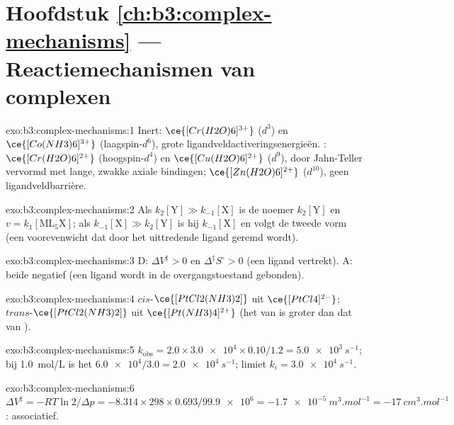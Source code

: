 \section*{Hoofdstuk \ref{ch:b3:complex-mechanisms} --- Reactiemechanismen van complexen}

\begin{solution}{exo:b3:complex-mechanisms:1}
Inert: $\ce{[Cr(H2O)6]^{3+}}$ ($d^3$) en $\ce{[Co(NH3)6]^{3+}}$ (laagspin-$d^6$), grote
ligandveldactiveringsenergieën. : $\ce{[Cr(H2O)6]^{2+}}$ (hoogspin-$d^4$) en $\ce{[Cu(H2O)6]^{2+}}$ ($d^9$),
door Jahn-Teller vervormd met lange, zwakke axiale bindingen; $\ce{[Zn(H2O)6]^{2+}}$ ($d^{10}$), geen
ligandveldbarrière.
\end{solution}

\begin{solution}{exo:b3:complex-mechanisms:2}
Als $k_2[\mathrm Y] \gg k_{-1}[\mathrm X]$ is de noemer $k_2[\mathrm Y]$ en $v = k_1[\mathrm{ML_5X}]$; als $k_{-1}[\mathrm X] \gg k_2[\mathrm Y]$ is hij
$k_{-1}[\mathrm X]$ en volgt de tweede vorm (een voorevenwicht dat door het uittredende
ligand geremd wordt).
\end{solution}

\begin{solution}{exo:b3:complex-mechanisms:3}
D: $\Delta V^{\ddagger} > 0$ en $\Delta^{\ddagger}S^\circ > 0$ (een ligand vertrekt). A: beide negatief (een ligand wordt in
de overgangstoestand gebonden).
\end{solution}

\begin{solution}{exo:b3:complex-mechanisms:4}
$cis$-$\ce{[PtCl2(NH3)2]}$ uit $\ce{[PtCl4]^{2-}}$; $trans$-$\ce{[PtCl2(NH3)2]}$ uit $\ce{[Pt(NH3)4]^{2+}}$ (het
 van  is groter dan dat van ).
\end{solution}

\begin{solution}{exo:b3:complex-mechanisms:5}
$k_{\mathrm{obs}} = 2.0 \times \num{3.0e4} \times 0.10/1.2 = \qty{5.0e3}{s^{-1}}$; bij \qty{1.0}{mol/L} is het $\num{6.0e4}/3.0 = \qty{2.0e4}{s^{-1}}$; limiet
$k_i = \qty{3.0e4}{s^{-1}}$.
\end{solution}

\begin{solution}{exo:b3:complex-mechanisms:6}
$\Delta V^{\ddagger} = -RT\ln2/\Delta p = -8.314 \times 298 \times 0.693/\num{99.9e6} = \qty{-1.7e-5}{m^3.mol^{-1}} = \qty{-17}{cm^3.mol^{-1}}$:
associatief.
\end{solution}

